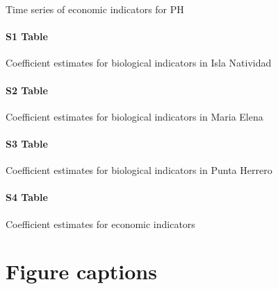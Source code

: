 \documentclass{frontiersSCNS}
\begin{document}
Time series of economic indicators for PH

\paragraph*{S1 Table}
\label{S1_Table}

Coefficient estimates for biological indicators in Isla Natividad

\paragraph*{S2 Table}
\label{S2_Table}

Coefficient estimates for biological indicators in Maria Elena

\paragraph*{S3 Table}
\label{S3_Table}

Coefficient estimates for biological indicators in Punta Herrero

\paragraph*{S4 Table}
\label{S4_Table}

Coefficient estimates for economic indicators



\section*{Figure captions}
\end{document}
